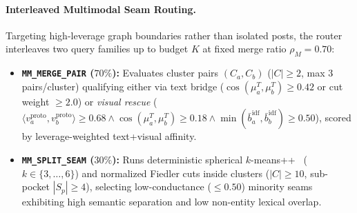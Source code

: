 \paragraph{Interleaved Multimodal Seam Routing.}
Targeting high-leverage graph boundaries rather than isolated posts, the router interleaves two query families up to budget $K$ at fixed merge ratio $\rho_M = 0.70$:
\begin{itemize}
    \item \textbf{\texttt{MM\_MERGE\_PAIR} ($70\%$):} Evaluates cluster pairs $(C_a, C_b)$ ($|C| \ge 2$, max 3 pairs/cluster) qualifying either via text bridge ($\cos(\mu_a^T, \mu_b^T) \ge 0.42$ or cut weight $\ge 2.0$) or \emph{visual rescue} ($\langle v^{\text{proto}}_a, v^{\text{proto}}_b \rangle \ge 0.68 \wedge \cos(\mu_a^T, \mu_b^T) \ge 0.18 \wedge \min(\bar{b}_a^{\text{idf}}, \bar{b}_b^{\text{idf}}) \ge 0.50$), scored by leverage-weighted text+visual affinity.
    \item \textbf{\texttt{MM\_SPLIT\_SEAM} ($30\%$):} Runs deterministic spherical $k$-means++~\cite{arthur2007kmeanspp} ($k \in \{3,\dots,6\}$) and normalized Fiedler cuts inside clusters ($|C| \ge 10$, sub-pocket $|S_p| \ge 4$), selecting low-conductance ($\le 0.50$) minority seams exhibiting high semantic separation and low non-entity lexical overlap.
\end{itemize}

